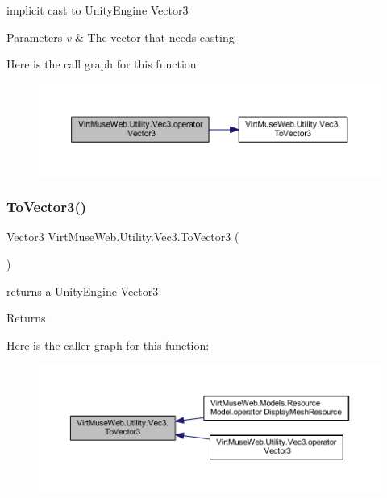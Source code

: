 implicit cast to Unity\+Engine Vector3 


\begin{DoxyParams}{Parameters}
{\em v} & The vector that needs casting\\
\hline
\end{DoxyParams}
Here is the call graph for this function\+:
\nopagebreak
\begin{figure}[H]
\begin{center}
\leavevmode
\includegraphics[width=350pt]{class_virt_muse_web_1_1_utility_1_1_vec3_af34a58052ccc174dce6803eeabaa9647_cgraph}
\end{center}
\end{figure}
\mbox{\label{class_virt_muse_web_1_1_utility_1_1_vec3_a0328deac658dc5e70dcf34da465d21fc}} 
\subsubsection{\texorpdfstring{To\+Vector3()}{ToVector3()}}
{\footnotesize\ttfamily Vector3 Virt\+Muse\+Web.\+Utility.\+Vec3.\+To\+Vector3 (\begin{DoxyParamCaption}{ }\end{DoxyParamCaption})}



returns a Unity\+Engine Vector3 

\begin{DoxyReturn}{Returns}

\end{DoxyReturn}
Here is the caller graph for this function\+:
\nopagebreak
\begin{figure}[H]
\begin{center}
\leavevmode
\includegraphics[width=350pt]{class_virt_muse_web_1_1_utility_1_1_vec3_a0328deac658dc5e70dcf34da465d21fc_icgraph}
\end{center}
\end{figure}


